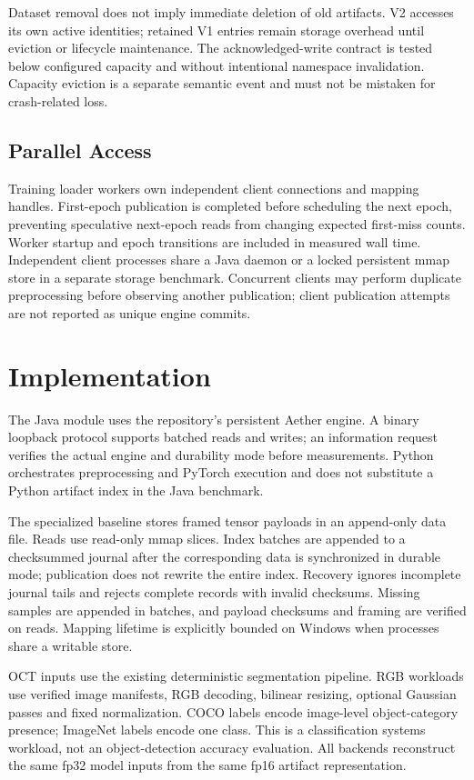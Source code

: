 \documentclass[journal]{IEEEtran}
\begin{document}
Dataset removal does not imply immediate deletion of old artifacts. V2 accesses its own active identities; retained V1 entries remain storage overhead until eviction or lifecycle maintenance. The acknowledged-write contract is tested below configured capacity and without intentional namespace invalidation. Capacity eviction is a separate semantic event and must not be mistaken for crash-related loss.

\subsection{Parallel Access}
Training loader workers own independent client connections and mapping handles. First-epoch publication is completed before scheduling the next epoch, preventing speculative next-epoch reads from changing expected first-miss counts. Worker startup and epoch transitions are included in measured wall time. Independent client processes share a Java daemon or a locked persistent mmap store in a separate storage benchmark. Concurrent clients may perform duplicate preprocessing before observing another publication; client publication attempts are not reported as unique engine commits.

\section{Implementation}
The Java module uses the repository's persistent Aether engine. A binary loopback protocol supports batched reads and writes; an information request verifies the actual engine and durability mode before measurements. Python orchestrates preprocessing and PyTorch execution and does not substitute a Python artifact index in the Java benchmark.

The specialized baseline stores framed tensor payloads in an append-only data file. Reads use read-only mmap slices. Index batches are appended to a checksummed journal after the corresponding data is synchronized in durable mode; publication does not rewrite the entire index. Recovery ignores incomplete journal tails and rejects complete records with invalid checksums. Missing samples are appended in batches, and payload checksums and framing are verified on reads. Mapping lifetime is explicitly bounded on Windows when processes share a writable store.

OCT inputs use the existing deterministic segmentation pipeline. RGB workloads use verified image manifests, RGB decoding, bilinear resizing, optional Gaussian passes and fixed normalization. COCO labels encode image-level object-category presence; ImageNet labels encode one class. This is a classification systems workload, not an object-detection accuracy evaluation. All backends reconstruct the same fp32 model inputs from the same fp16 artifact representation.
\end{document}
